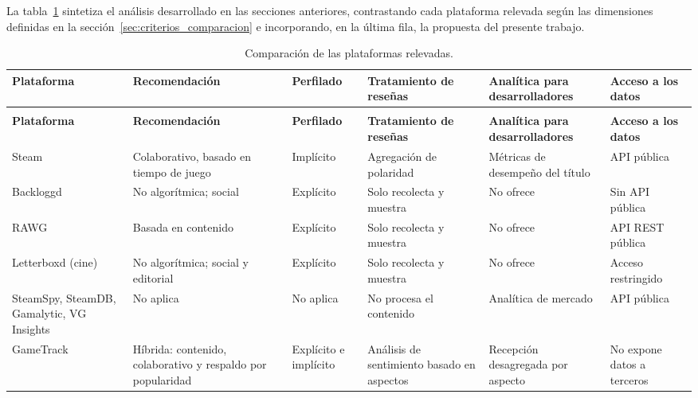 La tabla~\ref{tab:comparativa_plataformas} sintetiza el análisis desarrollado en las secciones anteriores, contrastando cada plataforma relevada según las dimensiones definidas en la sección~\ref{sec:criterios_comparacion} e incorporando, en la última fila, la propuesta del presente trabajo.

\setlength{\tabcolsep}{4pt}
\begin{longtable}{|>{\raggedright\arraybackslash}p{1.8cm}|>{\raggedright\arraybackslash}p{2.3cm}|>{\raggedright\arraybackslash}p{1.5cm}|>{\raggedright\arraybackslash}p{2.5cm}|>{\raggedright\arraybackslash}p{2.5cm}|>{\raggedright\arraybackslash}p{1.9cm}|}
	\caption{Comparación de las plataformas relevadas.}\label{tab:comparativa_plataformas} \\
	\hline
	\textbf{Plataforma} & \textbf{Recomendación} & \textbf{Perfilado} & \textbf{Tratamiento de reseñas} & \textbf{Analítica para desarrolladores} & \textbf{Acceso a los datos} \\
	\hline
	\endfirsthead
	\multicolumn{6}{l}{\textit{Continuación de la Tabla \ref{tab:comparativa_plataformas}}} \\
	\hline
	\textbf{Plataforma} & \textbf{Recomendación} & \textbf{Perfilado} & \textbf{Tratamiento de reseñas} & \textbf{Analítica para desarrolladores} & \textbf{Acceso a los datos} \\
	\hline
	\endhead
	\hline
	\endfoot
	\hline
	\endlastfoot
	Steam & Colaborativo, basado en tiempo de juego & Implícito & Agregación de polaridad & Métricas de desempeño del título & API pública \\
	Backloggd & No algorítmica; social & Explícito & Solo recolecta y muestra & No ofrece & Sin API pública \\
	RAWG & Basada en contenido & Explícito & Solo recolecta y muestra & No ofrece & API REST pública \\
	Letterboxd (cine) & No algorítmica; social y editorial & Explícito & Solo recolecta y muestra & No ofrece & Acceso restringido \\
	SteamSpy, SteamDB, Gamalytic, VG Insights & No aplica & No aplica & No procesa el contenido & Analítica de mercado & API pública \\
	GameTrack & Híbrida: contenido, colaborativo y respaldo por popularidad & Explícito e implícito & Análisis de sentimiento basado en aspectos & Recepción desagregada por aspecto & No expone datos a terceros \\
\end{longtable}
\setlength{\tabcolsep}{6pt}

